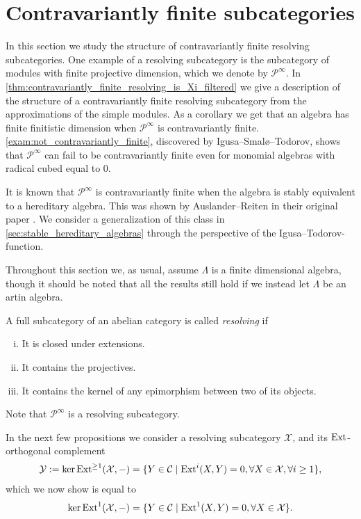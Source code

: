 \section{Contravariantly finite subcategories}\label{sec:contravariantly_finite}


In this section we study the structure of contravariantly finite resolving subcategories. One example of a resolving subcategory is the subcategory of modules with finite projective dimension, which we denote by $\mathcal P^\infty$. In \cref{thm:contravariantly_finite_resolving_is_Xi_filtered} we give a description of the structure of a contravariantly finite resolving subcategory from the approximations of the simple modules. As a corollary we get that an algebra has finite finitistic dimension when $\mathcal P^\infty$ is contravariantly finite. \cref{exam:not_contravariantly_finite}, discovered by Igusa--Smalø--Todorov, shows that $\mathcal P^\infty$ can fail to be contravariantly finite even for monomial algebras with radical cubed equal to 0.

It is known that $\mathcal P^\infty$ is contravariantly finite when the algebra is stably equivalent to a hereditary algebra. This was shown by Auslander--Reiten in their original paper \cite{AR91}. We consider a generalization of this class in \cref{sec:stable_hereditary_algebras} through the perspective of the Igusa--Todorov-function.

Throughout this section we, as usual, assume $\Lambda$ is a finite dimensional algebra, though it should be noted that all the results still hold if we instead let $\Lambda$ be an artin algebra.

\begin{defn}[Resolving]
	A full subcategory of an abelian category is called \emph{resolving} if 
	\begin{enumerate}[i)]
		\item It is closed under extensions.
		\item It contains the projectives.
		\item It contains the kernel of any epimorphism between two of its objects.
	\end{enumerate}
\end{defn}

Note that $\mathcal P^\infty$ is a resolving subcategory.

In the next few propositions we consider a resolving subcategory $\mathcal X$, and its $\operatorname{Ext}$-orthogonal complement
\begin{align*}
	\mathcal Y := \ker \operatorname{Ext}^{\geq 1}(\mathcal X, -) = \{Y \in \mathcal C \mid \operatorname{Ext}^i(X, Y)=0, \forall X \in \mathcal X, \forall i \geq 1\},
\end{align*}
which we now show is equal to 
\begin{align*}
\ker \operatorname{Ext}^1(\mathcal X, -) = \{Y \in \mathcal C \mid \operatorname{Ext}^1(X, Y)=0, \forall X \in \mathcal X\}.
\end{align*}

